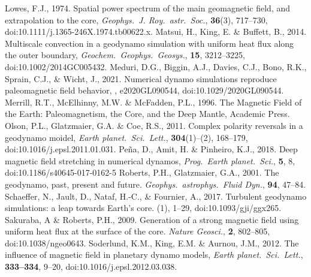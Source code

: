 \begin{thebibliography}{}
%
Lowes, F.J., 1974. Spatial power spectrum of the main geomagnetic field, and extrapolation to the core, {\it Geophys.\ J. Roy.\ astr.\ Soc.}, {\bf 36}(3), 717--730, doi:10.1111/j.1365-246X.1974.tb00622.x.
%
Matsui, H., King, E. \& Buffett, B., 2014. Multiscale convection in a geodynamo simulation with uniform heat flux along the outer boundary, {\it Geochem.\ Geophys.\ Geosys.}, {\bf 15},  3212--3225, doi:10.1002/2014GC005432.
%
{\color{red}
Meduri, D.G., Biggin, A.J., Davies, C.J., Bono, R.K., Sprain, C.J., \& Wicht, J., 2021. Numerical dynamo simulations reproduce paleomagnetic field behavior, , e2020GL090544, doi:10.1029/2020GL090544.
}
%
Merrill, R.T., McElhinny, M.W. \& McFadden, P.L., 1996. The Magnetic Field of the Earth: Paleomagnetism, the Core, and the Deep Mantle, Academic Press.
%
Olson, P.L., Glatzmaier, G.A. \& Coe, R.S., 2011. Complex polarity reversals in a geodynamo moidel, {\it Earth planet.\ Sci.\ Lett.}, {\bf 304}(1)--(2), 168--179, doi:10.1016/j.epsl.2011.01.031.
%
{\color{red}
Pe{\~n}a, D., Amit, H. \& Pinheiro, K.J., 2018. Deep magnetic field stretching in numerical dynamos, {\it Prog.\ Earth planet.\ Sci.}, {\bf 5}, 8, doi:10.1186/s40645-017-0162-5
}
%
{\color{red}
Roberts, P.H.,  Glatzmaier, G.A., 2001. The geodynamo, past, present and future. {\it Geophys.\ astrophys.\ Fluid Dyn.}, {\bf 94}, 47--84.
}
%
{\color{red}
Schaeffer, N., Jault, D., Nataf, H.-C., \& Fournier, A., 2017. Turbulent geodynamo simulations: a leap towards Earth's core. (1), 1--29, doi:10.1093/gji/ggx265.
}
%
{\color{red}
Sakuraba, A \& Roberts, P.H., 2009. Generation of a strong magnetic field using uniform heat flux at the surface of the core. {\it Nature Geosci.}, {\bf 2}, 802--805, doi:10.1038/ngeo0643.
}
%
Soderlund, K.M., King, E.M. \& Aurnou, J.M., 2012. The influence of magnetic field in planetary dynamo models, {\it Earth planet.\ Sci.\ Lett.}, {\bf 333--334}, 9--20, doi:10.1016/j.epsl.2012.03.038.

\end{thebibliography}
